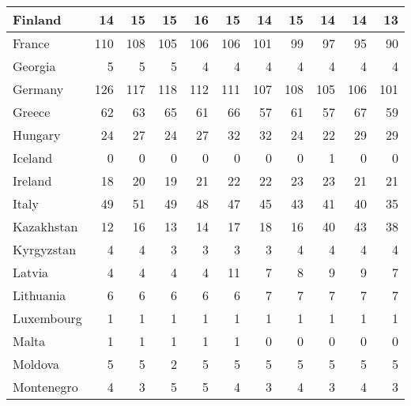 \begin{table}
\begin{tabular}{|l|r|r|r|r|r|r|r|r|r|r|}
                       Finland&     14&     15&     15&     16&     15&     14&     15&     14&     14&     13\\\hline
                        France&    110&    108&    105&    106&    106&    101&     99&     97&     95&     90\\\hline
                       Georgia&      5&      5&      5&      4&      4&      4&      4&      4&      4&      4\\\hline
                       Germany&    126&    117&    118&    112&    111&    107&    108&    105&    106&    101\\\hline
                        Greece&     62&     63&     65&     61&     66&     57&     61&     57&     67&     59\\\hline
                       Hungary&     24&     27&     24&     27&     32&     32&     24&     22&     29&     29\\\hline
                       Iceland&      0&      0&      0&      0&      0&      0&      0&      1&      0&      0\\\hline
                       Ireland&     18&     20&     19&     21&     22&     22&     23&     23&     21&     21\\\hline
                         Italy&     49&     51&     49&     48&     47&     45&     43&     41&     40&     35\\\hline
                    Kazakhstan&     12&     16&     13&     14&     17&     18&     16&     40&     43&     38\\\hline
                    Kyrgyzstan&      4&      4&      3&      3&      3&      3&      4&      4&      4&      4\\\hline
                        Latvia&      4&      4&      4&      4&     11&      7&      8&      9&      9&      7\\\hline
                     Lithuania&      6&      6&      6&      6&      6&      7&      7&      7&      7&      7\\\hline
                    Luxembourg&      1&      1&      1&      1&      1&      1&      1&      1&      1&      1\\\hline
                         Malta&      1&      1&      1&      1&      1&      0&      0&      0&      0&      0\\\hline
                       Moldova&      5&      5&      2&      5&      5&      5&      5&      5&      5&      5\\\hline
                    Montenegro&      4&      3&      5&      5&      4&      3&      4&      3&      4&      3\\\hline

\end{tabular}
\end{table}
